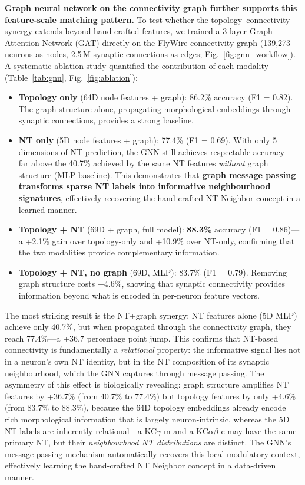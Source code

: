 \documentclass[10pt]{article}
\begin{document}
\textbf{Graph neural network on the connectivity graph further supports this feature-scale matching pattern.} To test whether the topology--connectivity synergy extends beyond hand-crafted features, we trained a 3-layer Graph Attention Network (GAT) directly on the FlyWire connectivity graph (139,273 neurons as nodes, 2.5\,M synaptic connections as edges; Fig.~\ref{fig:gnn_workflow}). A systematic ablation study quantified the contribution of each modality (Table~\ref{tab:gnn}, Fig.~\ref{fig:ablation}):

\begin{itemize}
\item \textbf{Topology only} (64D node features + graph): 86.2\% accuracy (F1 = 0.82). The graph structure alone, propagating morphological embeddings through synaptic connections, provides a strong baseline.
\item \textbf{NT only} (5D node features + graph): 77.4\% (F1 = 0.69). With only 5 dimensions of NT prediction, the GNN still achieves respectable accuracy---far above the 40.7\% achieved by the same NT features \textit{without} graph structure (MLP baseline). This demonstrates that \textbf{graph message passing transforms sparse NT labels into informative neighbourhood signatures}, effectively recovering the hand-crafted NT Neighbor concept in a learned manner.
\item \textbf{Topology + NT} (69D + graph, full model): \textbf{88.3\%} accuracy (F1 = 0.86)---a +2.1\% gain over topology-only and +10.9\% over NT-only, confirming that the two modalities provide complementary information.
\item \textbf{Topology + NT, no graph} (69D, MLP): 83.7\% (F1 = 0.79). Removing graph structure costs $-$4.6\%, showing that synaptic connectivity provides information beyond what is encoded in per-neuron feature vectors.
\end{itemize}

The most striking result is the NT+graph synergy: NT features alone (5D MLP) achieve only 40.7\%, but when propagated through the connectivity graph, they reach 77.4\%---a +36.7 percentage point jump. This confirms that NT-based connectivity is fundamentally a \textit{relational} property: the informative signal lies not in a neuron's own NT identity, but in the NT composition of its synaptic neighbourhood, which the GNN captures through message passing. The asymmetry of this effect is biologically revealing: graph structure amplifies NT features by +36.7\% (from 40.7\% to 77.4\%) but topology features by only +4.6\% (from 83.7\% to 88.3\%), because the 64D topology embeddings already encode rich morphological information that is largely neuron-intrinsic, whereas the 5D NT labels are inherently relational---a KC$\gamma$-m and a KC$\alpha\beta$-c may have the same primary NT, but their \textit{neighbourhood NT distributions} are distinct. The GNN's message passing mechanism automatically recovers this local modulatory context, effectively learning the hand-crafted NT Neighbor concept in a data-driven manner.
\end{document}

